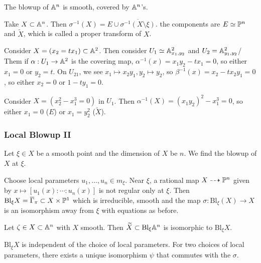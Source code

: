 \documentclass[twoside, 10pt]{article}
\begin{document}
    \begin{cor}
        The blowup of $\A^n$ is smooth, covered by $\A^n$'s.
    \end{cor}

    \begin{defn}
        Take $X \subset \A^n$. Then $\sigma^{-1}(X) = E \cup \overline{\sigma^{-1}(X \setminus \xi)}$. the components are $E \simeq \P^n$ and $\widetilde{X}$, which is called a proper transform of $X$.
    \end{defn}

    \begin{exm}
        Consider $X = (x_2=tx_1) \subset \A^2$. Then consider $U_1 \simeq \A^2_{x_1,y_2}$ and $U_2 = \A^2_{y_1,y_2}$/ Them if $\alpha:U_1 \to \A^2$ is the covering map, $\alpha^{-1}(x) = x_1y_2-tx_1=0$, so either $x_1=0$ or $y_2=t$. On $U_{21}$, we see $x_1 \mapsto x_2y_1, y_2 \mapsto y_2$, so $\beta^{-1}(x) = x_2-tx_2y_1 = 0$, so either $x_2 = 0$ or $1-ty_1 = 0$.
    \end{exm}

    \begin{exm}
        Consider $X  =(x_2^2-x_1^3=0)$ in $U_1$. Then $\alpha^{-1}(X) = (x_1y_2)^2-x_1^3 = 0$, so either $x_1=0$ ($E$) or $x_1=y_2^2$ ($\widetilde{X}$).
    \end{exm}

    \subsubsection{Local Blowup II}
    Let $\xi \in X$ be a smooth point and the dimension of $X$ be $n$. We find the blowup of $X$ at $\xi$.
    \begin{defn}
        Choose local parameters $u_1, \ldots, u_n \in m_{\xi}$. Near $\xi$, a rational map $X \dashrightarrow \P^n$ given by $x \mapsto [u_1(x): \cdots : u_n(x)]$ is not regular only at $\xi$. Then $\mathrm{Bl}_{\xi} X = \overline{\Gamma}_{\pi} \subset X \times \P^1$ which is irreducible, smooth and the map $\sigma: \mathrm{Bl}_{\xi}(X) \to X$ is an isomorphism away from $\xi$ with equations as before.
    \end{defn}

    \begin{thm}
        Let $\zeta \in X \subset \A^n$ with $X$ smooth. Then $\widetilde{X} \subset \mathrm{Bl}_{\xi} \A^n$ is isomorphic to $\mathrm{Bl}_{\xi} X$.
    \end{thm}

    \begin{thm}
        $\mathrm{Bl}_{\xi} X$ is independent of the choice of local parameters. For two choices of local parameters, there exists a unique isomorphism $\psi$ that commutes with the $\sigma$.
    \end{thm}
\end{document}
